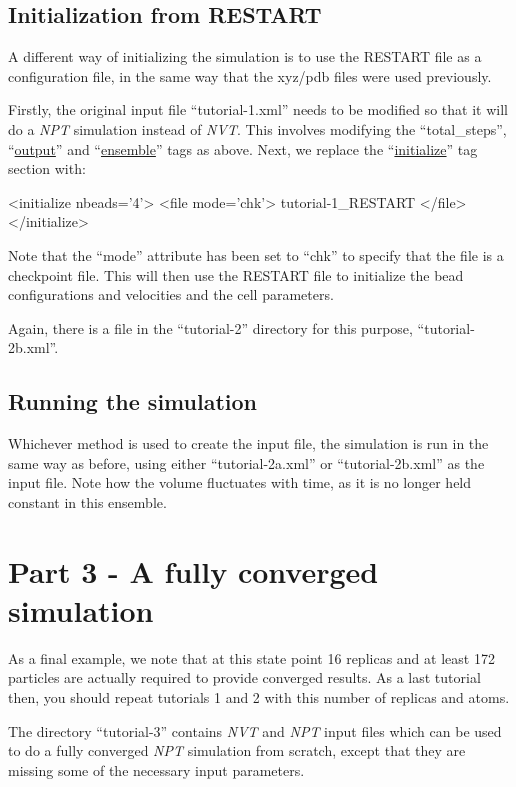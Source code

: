 \documentclass[11pt,english,fleqn]{report}
\newenvironment{code}{%
\footnotesize
\verbatim
}{
\endverbatim
\normalsize
}
\begin{document}
\subsection{Initialization from RESTART}

A different way of initializing the simulation is to use the
RESTART file as a configuration file, in the same way that
the xyz/pdb files were used previously.

Firstly, the original input file {}``tutorial-1.xml'' needs to
be modified so that
it will do a \emph{NPT} simulation instead of \emph{NVT}. This involves modifying
the {}``total\_steps'', {}``\hyperref[OUTPUTS]{output}'' and
{}``\hyperref[ENSEMBLE]{ensemble}'' tags as above. Next, we replace the
{}``\hyperref[INITIALIZER]{initialize}'' tag section with:

\begin{code}
<initialize nbeads='4'>
   <file mode='chk'> tutorial-1_RESTART </file>
</initialize>
\end{code}

Note that the {}``mode'' attribute has been set to {}``chk''
to specify that the file is a checkpoint file.
This will then use the RESTART file to initialize the bead
configurations and velocities and the cell parameters.

Again, there is a file in the {}``tutorial-2'' directory
for this purpose, {}``tutorial-2b.xml''.

\subsection{Running the simulation}

Whichever method is used to create the input file, the simulation
is run in the same way as before, using either
{}``tutorial-2a.xml'' or {}``tutorial-2b.xml'' as the input file.
Note how the volume fluctuates with time, as it is no longer held
constant in this ensemble.

\section{Part 3 - A fully converged simulation}

As a final example, we note that at this state point 16 replicas
and at least 172 particles are actually
required to provide converged results.
As a last tutorial then, you should repeat tutorials 1 and 2 with
this number of replicas and atoms.

The directory {}``tutorial-3'' contains
\emph{NVT} and \emph{NPT} input files which can be used to do a fully converged
\emph{NPT} simulation from scratch, except that they are missing some
of the necessary input parameters.
\end{document}

